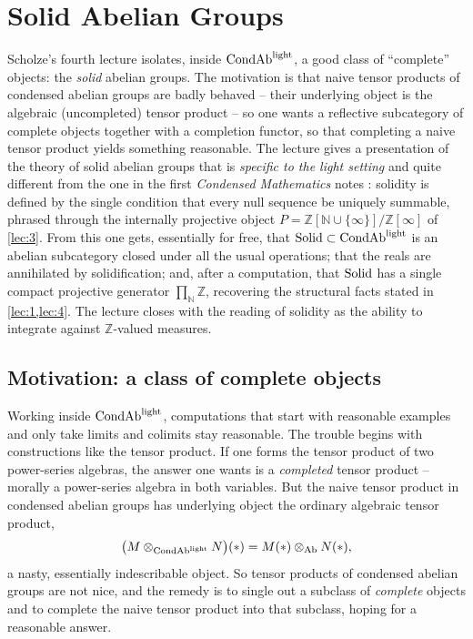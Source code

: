 \section{Solid Abelian Groups}
\label{lec:5}

Scholze's fourth lecture isolates, inside $\mathrm{CondAb}^{\mathrm{light}}$, a good class of
``complete'' objects: the \emph{solid} abelian groups. The motivation is that
naive tensor products of condensed abelian groups are badly behaved -- their
underlying object is the algebraic (uncompleted) tensor product -- so one wants
a reflective subcategory of complete objects together with a completion functor,
so that completing a naive tensor product yields something reasonable. The
lecture gives a presentation of the theory of solid abelian groups that is
\emph{specific to the light setting} and quite different from the one in the
first \emph{Condensed Mathematics} notes \cite{scholze2019condensed}: solidity is
defined by the single condition that every null sequence be uniquely summable,
phrased through the internally projective object $P=\mathbb{Z}[\mathbb{N}\cup
\{\infty\}]/\mathbb{Z}[\infty]$ of \cref{lec:3}. From this one gets, essentially
for free, that $\mathrm{Solid}\subset\mathrm{CondAb}^{\mathrm{light}}$ is an abelian subcategory closed under all
the usual operations; that the reals are annihilated by solidification; and,
after a computation, that $\mathrm{Solid}$ has a single compact projective generator
$\prod_{\mathbb{N}}\mathbb{Z}$, recovering the structural facts stated in
\cref{lec:1,lec:4}. The lecture closes with the reading of solidity as the
ability to integrate against $\mathbb{Z}$-valued measures.

\subsection{Motivation: a class of complete objects}

\begin{remark}
\label{rmk:5:tensor-motivation}
Working inside $\mathrm{CondAb}^{\mathrm{light}}$, computations that start with reasonable examples and
only take limits and colimits stay reasonable. The trouble begins with
constructions like the tensor product. If one forms the tensor product of two
power-series algebras, the answer one wants is a \emph{completed} tensor product
-- morally a power-series algebra in both variables. But the naive tensor
product in condensed abelian groups has underlying object the ordinary algebraic
tensor product,
\begin{equation*}
\bigl(M\otimes_{\mathrm{CondAb}^{\mathrm{light}}}N\bigr)(\ast)=M(\ast)\otimes_{\mathrm{Ab}}N(\ast),
\end{equation*}
a nasty, essentially indescribable object. So tensor products of condensed
abelian groups are not nice, and the remedy is to single out a subclass of
\emph{complete} objects and to complete the naive tensor product into that
subclass, hoping for a reasonable answer.
\end{remark}

